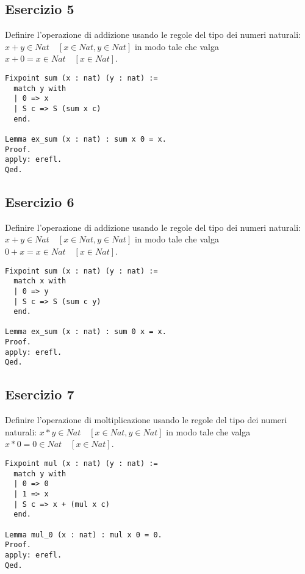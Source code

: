 \subsection{Esercizio 5}

Definire l'operazione di addizione usando le regole del tipo dei numeri naturali:
$x + y \in Nat \quad [x \in Nat, y \in Nat]$
in modo tale che valga $x + 0 = x \in Nat \quad [x \in Nat]$.

\begin{lstlisting}[language=Coq]
Fixpoint sum (x : nat) (y : nat) :=
  match y with
  | 0 => x
  | S c => S (sum x c)
  end.

Lemma ex_sum (x : nat) : sum x 0 = x.
Proof.
apply: erefl.
Qed.
\end{lstlisting}

\subsection{Esercizio 6}

Definire l'operazione di addizione usando le regole del tipo dei numeri naturali:
$x + y \in Nat \quad [x \in Nat, y \in Nat]$
in modo tale che valga $0 + x = x \in Nat \quad [x \in Nat]$.

\begin{lstlisting}[language=Coq]
Fixpoint sum (x : nat) (y : nat) :=
  match x with
  | 0 => y
  | S c => S (sum c y)
  end.

Lemma ex_sum (x : nat) : sum 0 x = x.
Proof.
apply: erefl.
Qed.
\end{lstlisting}

\subsection{Esercizio 7}

Definire l'operazione di moltiplicazione usando le regole del tipo dei numeri 
naturali: $x*y \in Nat \quad [x \in Nat, y \in Nat]$
in modo tale che valga $x*0 = 0 \in Nat \quad [x \in Nat]$.

\begin{lstlisting}[language=Coq]
Fixpoint mul (x : nat) (y : nat) :=
  match y with
  | 0 => 0
  | 1 => x
  | S c => x + (mul x c)
  end.

Lemma mul_0 (x : nat) : mul x 0 = 0.
Proof.
apply: erefl.
Qed.
\end{lstlisting}
